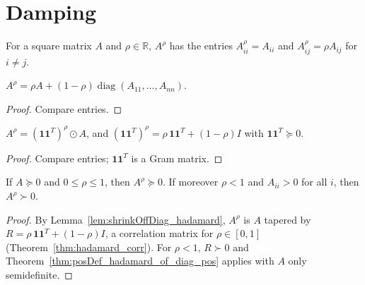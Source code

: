 \section{Damping}

\begin{definition}\label{def:shrinkOffDiag}
  \leanok
  For a square matrix $A$ and $\rho\in\mathbb{R}$, $A^\rho$ has the entries
  $A^\rho_{ii} = A_{ii}$ and $A^\rho_{ij} = \rho A_{ij}$ for $i \ne j$.
\end{definition}

\begin{lemma}\label{lem:shrinkOffDiag_eq}
  \leanok
  $A^\rho = \rho A + (1-\rho)\operatorname{diag}(A_{11},\dots,A_{nn})$.
\end{lemma}
\begin{proof}
  \leanok
  Compare entries.
\end{proof}

\begin{lemma}\label{lem:shrinkOffDiag_hadamard}
  \leanok
  $A^\rho = (\mathbf 1\mathbf 1^T)^\rho \odot A$, and
  $(\mathbf 1\mathbf 1^T)^\rho = \rho\,\mathbf 1\mathbf 1^T + (1-\rho) I$ with
  $\mathbf 1\mathbf 1^T \succeq 0$.
\end{lemma}
\begin{proof}
  \leanok
  Compare entries; $\mathbf 1\mathbf 1^T$ is a Gram matrix.
\end{proof}

\begin{theorem}\label{thm:shrinkOffDiag_posDef}
  \leanok
  If $A \succeq 0$ and $0 \le \rho \le 1$, then $A^\rho \succeq 0$. If moreover
  $\rho < 1$ and $A_{ii} > 0$ for all $i$, then $A^\rho \succ 0$.
\end{theorem}
\begin{proof}
  \leanok
  By Lemma~\ref{lem:shrinkOffDiag_hadamard}, $A^\rho$ is $A$ tapered by
  $R = \rho\,\mathbf 1\mathbf 1^T + (1-\rho)I$, a correlation matrix for
  $\rho\in[0,1]$ (Theorem~\ref{thm:hadamard_corr}). For $\rho < 1$, $R \succ 0$
  and Theorem~\ref{thm:posDef_hadamard_of_diag_pos} applies with $A$ only
  semidefinite.
\end{proof}

